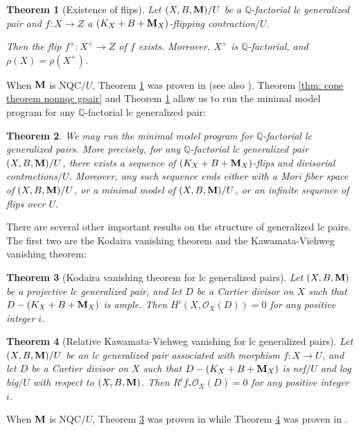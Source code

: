 \documentclass[11pt]{amsart}
\numberwithin{equation}{section}
\newcommand{\Mm}{{\bf{M}}}
\newcommand{\Qq}{\mathbb{Q}}
\newtheorem{thm}{Theorem}[subsection]
\theoremstyle{definition}
\theoremstyle{definition}
\theoremstyle{definition}
\begin{document}
\begin{thm}[Existence of flips]\label{thm: eof nonnqc}
Let $(X,B,\Mm)/U$ be a $\Qq$-factorial lc generalized pair and $f: X\rightarrow Z$ a $(K_X+B+\Mm_X)$-flipping contraction$/U$.

Then the flip $f^+: X^+\rightarrow Z$ of $f$ exists. Moreover, $X^+$ is $\Qq$-factorial, and $\rho(X)=\rho(X^+)$.
\end{thm}
When $\Mm$ is NQC$/U$, Theorem \ref{thm: eof nonnqc} was proven in \cite[Theorem 1.2]{HL21a} (see also \cite[Theorem 1.2]{LX23b}). Theorem \ref{thm: cone theorem nonnqc gpair} and Theorem \ref{thm: eof nonnqc} allow us to run the minimal model program for any $\Qq$-factorial lc generalized pair:

\begin{thm}\label{thm: qfact nonnqc mmp can run intro} 
We may run the minimal model program for $\Qq$-factorial lc generalized pairs. More precisely, for any $\mathbb Q$-factorial lc generalized pair $(X,B,\Mm)/U$, there exists a sequence of $(K_X+B+\Mm_X)$-flips and divisorial contractions$/U$. Moreover, any such sequence ends either with a Mori fiber space of $(X,B,\Mm)/U$, or a minimal model of $(X,B,\Mm)/U$, or an infinite sequence of flips over $U$.
\end{thm}

There are several other important results on the structure of generalized lc pairs. The first two are the Kodaira vanishing theorem and the Kawamata-Viehweg vanishing theorem:

\begin{thm}[Kodaira vanishing theorem for lc generalized pairs]\label{thm: kod vanishing gpair intro}
Let $(X,B,\Mm)$ be a projective lc generalized pair, and let $D$ be a Cartier divisor on $X$ such that $D-(K_X+B+\Mm_X)$ is ample. Then $H^i(X,\mathcal{O}_X(D))=0$ for any positive integer $i$.
\end{thm}

\begin{thm}[Relative Kawamata-Viehweg vanishing for lc generalized pairs]\label{thm: kv vanishing gpair intro}
Let $(X,B,\Mm)/U$ be an lc generalized pair associated with morphism $f: X\rightarrow U$, and let $D$ be a Cartier divisor on $X$ such that $D-(K_X+B+\Mm_X)$ is nef$/U$ and log big$/U$ with respect to $(X,B,\Mm)$. Then $R^if_*\mathcal{O}_X(D)=0$ for any positive integer $i$.
\end{thm}

When $\Mm$ is NQC$/U$, Theorem \ref{thm: kod vanishing gpair intro} was proven in \cite[Theorem 1.3]{CLX23} while Theorem \ref{thm: kv vanishing gpair intro} was proven in \cite[Theorem 1.4]{CLX23}.
\end{document}
